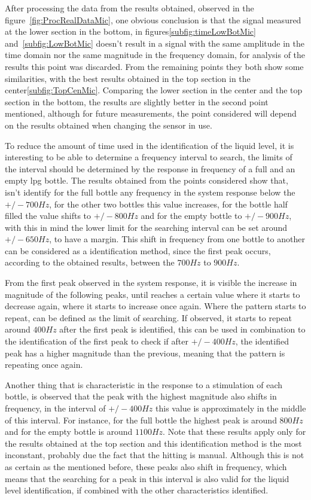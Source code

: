 After processing the data from the results obtained, observed in the figure~\ref{fig:ProcRealDataMic}, one obvious conclusion is that the signal measured at the lower section in the bottom, in figures\ref{subfig:timeLowBotMic} and~\ref{subfig:LowBotMic} doesn't result in a signal with the same amplitude in the time domain nor the same magnitude in the frequency domain, for analysis of the results this point was discarded. From the remaining points they both show some similarities, with the best results obtained in the top section in the center\ref{subfig:TopCenMic}. Comparing the lower section in the center and the top section in the bottom, the results are slightly better in the second point mentioned, although for future measurements, the point considered will depend on the results obtained when changing the sensor in use.

To reduce the amount of time used in the identification of the liquid level, it is interesting to be able to determine a frequency interval to search, the limits of the interval should be determined by the response in frequency of a full and an empty \acrshort{lpg} bottle. The results obtained from the points considered show that, isn't identify for the full bottle any frequency in the system response below the $+/-700Hz$, for the other two bottles this value increases, for the bottle half filled the value shifts to $+/-800Hz$ and for the empty bottle to $+/-900Hz$, with this in mind the lower limit for the searching interval can be set around $+/-650Hz$, to have a margin. This shift in frequency from one bottle to another can be considered as a identification method, since the first peak occurs, according to the obtained results, between the $700Hz$ to $900Hz$.

From the first peak observed in the system response, it is visible the increase in magnitude of the following peaks, until reaches a certain value where it starts to decrease again, where it starts to increase once again. Where the pattern starts to repeat, can be defined as the limit of searching. If observed, it starts to repeat around $400Hz$ after the first peak is identified, this can be used in combination to the identification of the first peak to check if after $+/-400Hz$, the identified peak has a higher magnitude than the previous, meaning that the pattern is repeating once again.

Another thing that is characteristic in the response to a stimulation of each bottle, is observed that the peak with the highest magnitude also shifts in frequency, in the interval of $+/-400Hz$ this value is approximately in the middle of this interval. For instance, for the full bottle the highest peak is around $800Hz$ and for the empty bottle is around $1100Hz$. Note that these results apply only for the results obtained at the top section and this identification method is the most inconstant, probably due the fact that the hitting is manual. Although this is not as certain as the mentioned before, these peaks also shift in frequency, which means that the searching for a peak in this interval is also valid for the liquid level identification, if combined with the other characteristics identified.


